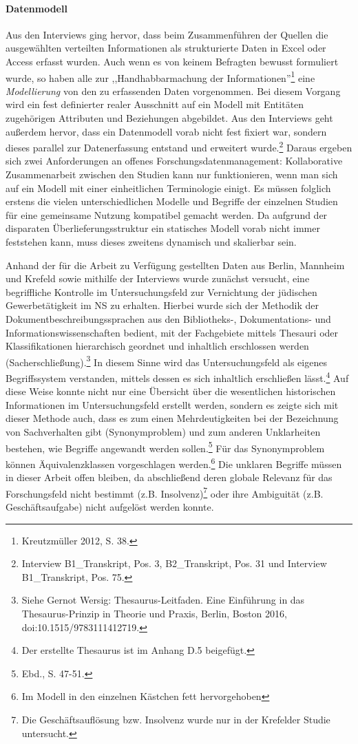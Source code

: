 \paragraph{Datenmodell} Aus den Interviews ging hervor, dass beim Zusammenführen der Quellen die ausgewählten verteilten Informationen als strukturierte Daten in Excel oder Access erfasst wurden. Auch wenn es von keinem Befragten bewusst formuliert wurde, so haben alle zur ,,Handhabbarmachung der Informationen''\footnote{Kreutzmüller 2012, S. 38.} eine \textit{Modellierung} von den zu erfassenden Daten vorgenommen. Bei diesem Vorgang wird ein fest definierter realer Ausschnitt auf ein Modell mit Entitäten zugehörigen Attributen und Beziehungen abgebildet. Aus den Interviews geht außerdem hervor, dass ein Datenmodell vorab nicht fest fixiert war, sondern dieses parallel zur Datenerfassung entstand und erweitert wurde.\footnote{Interview B1\_Transkript, Pos. 3, B2\_Transkript, Pos. 31 und Interview B1\_Transkript, Pos. 75.} Daraus ergeben sich zwei Anforderungen an offenes Forschungsdatenmanagement: Kollaborative Zusammenarbeit zwischen den Studien kann nur funktionieren, wenn man sich auf ein Modell mit einer einheitlichen Terminologie einigt. Es müssen folglich erstens die vielen unterschiedlichen Modelle und Begriffe der einzelnen Studien für eine gemeinsame Nutzung kompatibel gemacht werden. Da aufgrund der disparaten Überlieferungsstruktur ein statisches Modell vorab nicht immer feststehen kann, muss dieses zweitens dynamisch und skalierbar sein.

Anhand der für die Arbeit zu Verfügung gestellten Daten aus Berlin, Mannheim und Krefeld sowie mithilfe der Interviews wurde zunächst versucht, eine begriffliche Kontrolle im Untersuchungsfeld zur Vernichtung der jüdischen Gewerbetätigkeit im NS zu erhalten. Hierbei wurde sich der Methodik der Dokumentbeschreibungssprachen aus den Bibliotheks-, Dokumentations- und Informationswissenschaften bedient, mit der Fachgebiete mittels Thesauri oder Klassifikationen hierarchisch geordnet und inhaltlich erschlossen werden (Sacherschließung).\footnote{Siehe Gernot Wersig: Thesaurus-Leitfaden. Eine Einführung in das Thesaurus-Prinzip in Theorie und Praxis, Berlin, Boston 2016, doi:10.1515/9783111412719.} In diesem Sinne wird das Untersuchungsfeld als eigenes Begriffssystem verstanden, mittels dessen es sich inhaltlich erschließen lässt.\footnote{Der erstellte Thesaurus ist im Anhang D.5 beigefügt.} Auf diese Weise konnte nicht nur eine Übersicht über die wesentlichen historischen Informationen im Untersuchungsfeld erstellt werden, sondern es zeigte sich mit dieser Methode auch, dass es zum einen Mehrdeutigkeiten bei der Bezeichnung von Sachverhalten gibt (Synonymproblem) und zum anderen Unklarheiten bestehen, wie Begriffe angewandt werden sollen.\footnote{Ebd., S. 47-51.} Für das Synonymproblem können Äquivalenzklassen vorgeschlagen werden.\footnote{Im Modell in den einzelnen Kästchen fett hervorgehoben} Die unklaren Begriffe müssen in dieser Arbeit offen bleiben, da abschließend deren globale Relevanz für das Forschungsfeld nicht bestimmt (z.B. Insolvenz)\footnote{Die Geschäftsauflösung bzw. Insolvenz wurde nur in der Krefelder Studie untersucht.} oder ihre Ambiguität (z.B. Geschäftsaufgabe) nicht aufgelöst werden konnte. 

